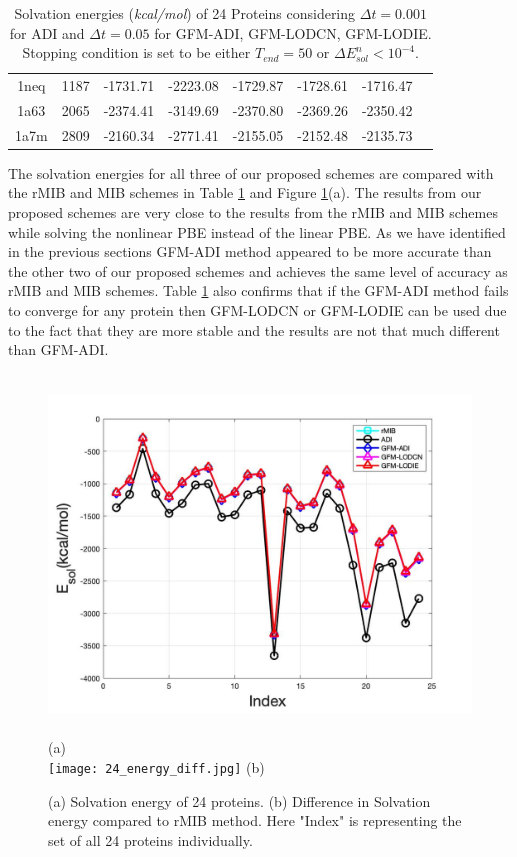 \begin{table}[!ht]
\begin{tabular}{ c c c c c c c c}
1neq & 1187 & -1731.71 & -2223.08 & -1729.87 & -1728.61 & -1716.47 \\
1a63 & 2065 & -2374.41 & -3149.69 & -2370.80 & -2369.26 & -2350.42 \\
1a7m & 2809 & -2160.34 & -2771.41 & -2155.05 & -2152.48 & -2135.73 \\ \hline
\end{tabular}
\caption{Solvation energies ({\it kcal/mol}) of 24 Proteins considering $\Delta t = 0.001$ for ADI and $\Delta t =0.05$ for GFM-ADI, GFM-LODCN, GFM-LODIE. Stopping condition is set to be either $T_{end}=50$ or $\Delta E^n_{sol}<10^{-4}$.}  
\label{tab:24protein}
\end{table}


The solvation energies for all three of our proposed schemes are compared  with the rMIB and MIB schemes in Table \ref{tab:24protein} and Figure \ref{fig:24protein}(a). The results from our proposed schemes are very close to the results from the rMIB and MIB schemes while solving the nonlinear PBE instead of the linear PBE. As we have identified in the previous sections GFM-ADI method appeared to be more accurate than the other two of our proposed schemes and achieves the same level of accuracy as rMIB and MIB schemes. Table \ref{tab:24protein} also confirms that if the GFM-ADI method fails to converge for any protein then GFM-LODCN or GFM-LODIE can be used due to the fact that they are more stable and the results are not that much different than GFM-ADI.   

\begin{figure}[H]
	\begin{center}		
	\includegraphics[width=\textwidth,height=270pt]{24_energy.jpg}\\
	(a)\\
\texttt{[image: 24\_energy\_diff.jpg]}
	(b)\\ 
	\end{center}
\caption{(a) Solvation energy of 24 proteins. (b) Difference in Solvation energy compared to rMIB method. Here "Index" is representing the set of all 24 proteins individually.}
\label{fig:24protein}
\end{figure}

